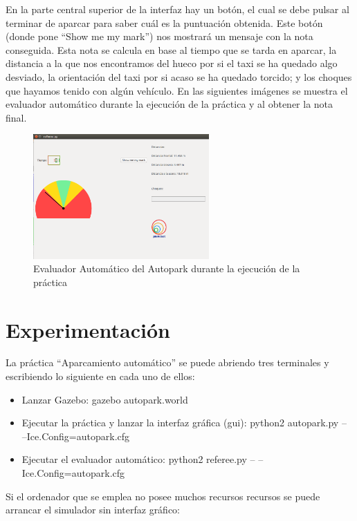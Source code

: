En la parte central superior de la interfaz hay un botón, el cual se debe pulsar al terminar de aparcar para saber cuál es la puntuación obtenida. Este botón (donde pone ``Show me my mark'') nos mostrará un mensaje con la nota conseguida. Esta nota se calcula en base al tiempo que se tarda en aparcar, la distancia a la que nos encontramos del hueco por si el taxi se ha quedado algo desviado, la orientación del taxi por si acaso se ha quedado torcido; y los choques que hayamos tenido con algún vehículo. En las siguientes imágenes se muestra el evaluador automático durante la ejecución de la práctica y al obtener la nota final.

\begin{figure}[H]
  \begin{center}
    \includegraphics[width=0.6\textwidth]{figures/Autopark/Referee_DurantePractica.png}
		\caption{Evaluador Automático del Autopark durante la ejecución de la práctica}
		\label{fig.Referee_DurantePractica}
		\end{center}
\end{figure}


\section{Experimentación}
La práctica “Aparcamiento automático” se puede abriendo tres terminales y escribiendo lo siguiente en cada uno de ellos:

\begin{itemize}
\item Lanzar Gazebo: gazebo autopark.world
\item	Ejecutar la práctica y lanzar la interfaz gráfica (\acrshort{gui}): python2 autopark.py -- --Ice.Config=autopark.cfg
\item	Ejecutar el evaluador automático: python2 referee.py -- --Ice.Config=autopark.cfg
\end{itemize}

Si el ordenador que se emplea no posee muchos recursos recursos se puede arrancar el simulador sin interfaz gráfico:

